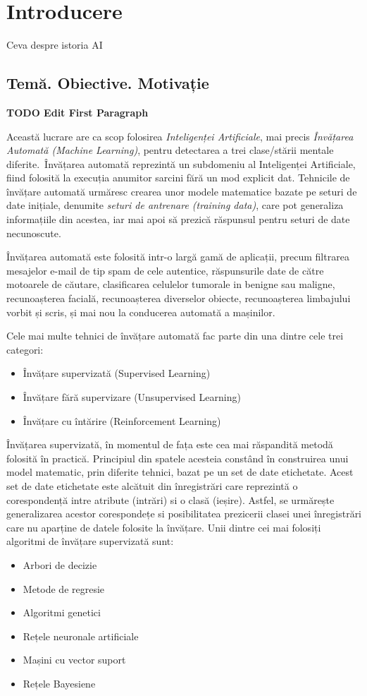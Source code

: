 \chapter{Introducere}\label{ch:1intro}
Ceva despre istoria AI
\section{Temă. Obiective. Motivație}
\textbf{TODO Edit First Paragraph}

Această lucrare are ca scop folosirea \textit{Inteligenței Artificiale}, mai precis \textit{Învățarea Automată (Machine Learning)}, pentru detectarea a trei clase/stării mentale diferite.\ Învățarea automată reprezintă un subdomeniu al Inteligenței Artificiale, fiind folosită la execuția anumitor sarcini fără un mod explicit dat. Tehnicile de învățare automată urmăresc crearea unor modele matematice bazate pe seturi de date inițiale, denumite \textit{seturi de antrenare (training data)}, care pot generaliza informațiile din acestea, iar mai apoi să prezică răspunsul pentru seturi de date necunoscute.

Învățarea automată este folosită intr-o largă gamă de aplicații, precum filtrarea mesajelor e-mail de tip spam de cele autentice, răspunsurile date de către motoarele de căutare, clasificarea celulelor tumorale in benigne sau maligne, recunoașterea facială, recunoașterea diverselor obiecte, recunoașterea limbajului vorbit și scris, și mai nou la conducerea automată a mașinilor. 

Cele mai multe tehnici de învățare automată fac parte din una dintre cele trei categori:
\begin{itemize}
	\item Învățare supervizată (Supervised Learning)
	\item Învățare fără supervizare (Unsupervised Learning)
	\item Învățare cu întărire (Reinforcement Learning)
\end{itemize}

Învățarea supervizată, în momentul de fața este cea mai răspandită metodă folosită în practică. Principiul din spatele acesteia constând în construirea unui model matematic, prin diferite tehnici, bazat pe un set de date etichetate. Acest set de date etichetate este alcătuit din înregistrări care reprezintă o corespondență intre atribute (intrări) si o clasă (ieșire). Astfel, se urmărește generalizarea acestor corespondețe si posibilitatea prezicerii clasei unei înregistrări care nu aparține de datele folosite la învățare. Unii dintre cei mai folosiți algoritmi de învățare supervizată sunt:
\begin{itemize}
	\item Arbori de decizie
	\item Metode de regresie
	\item Algoritmi genetici
	\item Rețele neuronale artificiale
	\item Mașini cu vector suport
	\item Rețele Bayesiene
\end{itemize}


